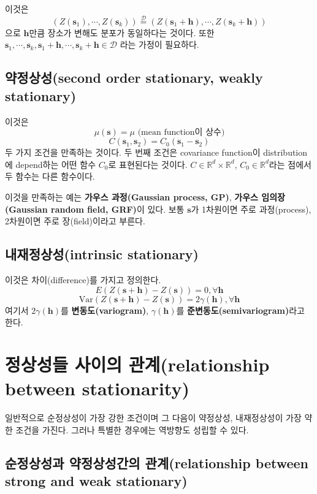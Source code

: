\documentclass[b5paper,]{scrbook}
\theoremstyle{plain}
\theoremstyle{definition}
\numberwithin{equation}{section}
\begin{document}
이것은
\[(Z(\mathbf{s}_{1}), \cdots , Z(\mathbf{s}_{k})) \stackrel{\mathcal{D}}{=} (Z(\mathbf{s}_{1}+\mathbf{h}), \cdots , Z(\mathbf{s}_{k}+\mathbf{h}))\]
으로 \(\mathbf{h}\)만큼 장소가 변해도 분포가 동일하다는 것이다. 또한
\(\mathbf{s}_{1}, \cdots , \mathbf{s}_{k}, \mathbf{s}_{1}+\mathbf{h}, \cdots , \mathbf{s}_{k}+\mathbf{h} \in \mathcal{D}\)
라는 가정이 필요하다.

\subsection{약정상성(second order stationary, weakly
stationary)}\label{second-order-stationary-weakly-stationary}

이것은 \[\mu(\mathbf{s})=\mu \text{ (mean function이 상수)}\]
\[C(\mathbf{s}_{1},\mathbf{s}_{2})=C_{0}(\mathbf{s}_{1}-\mathbf{s}_{2})\]
두 가지 조건을 만족하는 것이다. 두 번째 조건은 covariance function이
distribution에 depend하는 어떤 함수 \(C_{0}\)로 표현된다는 것이다.
\(C \in \mathbb{R}^{d}\times \mathbb{R}^{d}\),
\(C_{0} \in \mathbb{R}^{d}\)라는 점에서 두 함수는 다른 함수이다.

이것을 만족하는 예는 \textbf{가우스 과정(Gaussian process, GP)},
\textbf{가우스 임의장(Gaussian random field, GRF)}이 있다. 보통
\(\mathbf{s}\)가 1차원이면 주로 과정(process), 2차원이면 주로
장(field)이라고 부른다.

\subsection{내재정상성(intrinsic
stationary)}\label{intrinsic-stationary}

이것은 차이(difference)를 가지고 정의한다.
\[E(Z(\mathbf{s}+\mathbf{h})-Z(\mathbf{s}))=0, \forall \mathbf{h}\]
\[\text{Var}(Z(\mathbf{s}+\mathbf{h})-Z(\mathbf{s}))=2\gamma(\mathbf{h}), \forall \mathbf{h}\]
여기서 \(2\gamma(\mathbf{h})\)를 \textbf{변동도(variogram)},
\(\gamma(\mathbf{h})\)를 \textbf{준변동도(semivariogram)}라고 한다.

\section{정상성들 사이의 관계(relationship between
stationarity)}\label{--relationship-between-stationarity}

일반적으로 순정상성이 가장 강한 조건이며 그 다음이 약정상성,
내재정상성이 가장 약한 조건을 가진다. 그러나 특별한 경우에는 역방향도
성립할 수 있다.

\subsection{순정상성과 약정상성간의 관계(relationship between strong and
weak
stationary)}\label{--relationship-between-strong-and-weak-stationary}
\end{document}
